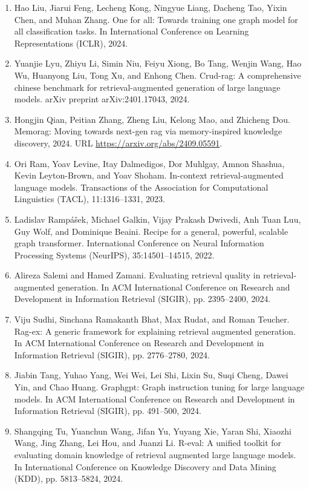 \documentclass[11pt,UTF8,fontset=fandol]{ctexart}
\begin{document}
\begin{enumerate}[leftmargin=2em]
\item Hao Liu, Jiarui Feng, Lecheng Kong, Ningyue Liang, Dacheng Tao, Yixin Chen, and Muhan Zhang. One for all: Towards training one graph model for all classification tasks. In International Conference on Learning Representations (ICLR), 2024.
\item Yuanjie Lyu, Zhiyu Li, Simin Niu, Feiyu Xiong, Bo Tang, Wenjin Wang, Hao Wu, Huanyong Liu, Tong Xu, and Enhong Chen. Crud-rag: A comprehensive chinese benchmark for retrieval-augmented generation of large language models. arXiv preprint arXiv:2401.17043, 2024.
\item Hongjin Qian, Peitian Zhang, Zheng Liu, Kelong Mao, and Zhicheng Dou. Memorag: Moving towards next-gen rag via memory-inspired knowledge discovery, 2024. URL \url{https://arxiv.org/abs/2409.05591}.
\item Ori Ram, Yoav Levine, Itay Dalmedigos, Dor Muhlgay, Amnon Shashua, Kevin Leyton-Brown, and Yoav Shoham. In-context retrieval-augmented language models. Transactions of the Association for Computational Linguistics (TACL), 11:1316--1331, 2023.
\item Ladislav Rampášek, Michael Galkin, Vijay Prakash Dwivedi, Anh Tuan Luu, Guy Wolf, and Dominique Beaini. Recipe for a general, powerful, scalable graph transformer. International Conference on Neural Information Processing Systems (NeurIPS), 35:14501--14515, 2022.
\item Alireza Salemi and Hamed Zamani. Evaluating retrieval quality in retrieval-augmented generation. In ACM International Conference on Research and Development in Information Retrieval (SIGIR), pp. 2395--2400, 2024.
\item Viju Sudhi, Sinchana Ramakanth Bhat, Max Rudat, and Roman Teucher. Rag-ex: A generic framework for explaining retrieval augmented generation. In ACM International Conference on Research and Development in Information Retrieval (SIGIR), pp. 2776--2780, 2024.
\item Jiabin Tang, Yuhao Yang, Wei Wei, Lei Shi, Lixin Su, Suqi Cheng, Dawei Yin, and Chao Huang. Graphgpt: Graph instruction tuning for large language models. In ACM International Conference on Research and Development in Information Retrieval (SIGIR), pp. 491--500, 2024.
\item Shangqing Tu, Yuanchun Wang, Jifan Yu, Yuyang Xie, Yaran Shi, Xiaozhi Wang, Jing Zhang, Lei Hou, and Juanzi Li. R-eval: A unified toolkit for evaluating domain knowledge of retrieval augmented large language models. In International Conference on Knowledge Discovery and Data Mining (KDD), pp. 5813--5824, 2024.

\end{enumerate}
\end{document}
